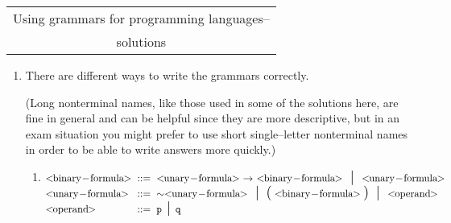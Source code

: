 \documentclass[11pt]{article}
\begin{document}
  \header{\course}
         {
           \begin{tabular}[t]{@{}c@{}}
             Using grammars for programming languages--
             \\
             solutions
           \end{tabular}
         }
         {\Term}

    \vspace{-2mm}

  \begin{enumerate}

    \addtolength{\itemsep}{8mm}

    \item There are different ways to write the grammars correctly.

          (Long nonterminal names, like those used in some of the solutions
           here, are fine in general and can be helpful since they are more
           descriptive, but in an exam situation you might prefer to use
           short single--letter nonterminal names in order to be able to
           write answers more quickly.)

          \vspace{-3mm}

          \begin{enumerate}

            \addtolength{\itemsep}{4mm}

            \item \newcommand{\binaryformula}{\ensuremath{<\!\!
                                            \mathrm{binary\!-\!formula} \!\!>}}
                  \newcommand{\unaryformula}{\ensuremath{<\!\!
                                             \mathrm{unary\!-\!formula} \!\!>}}
                  \newcommand{\operand}{\ensuremath{<\!\!
                                          \mathrm{operand} \!\!>}}

                  \(
                    \renewcommand{\arraystretch}{1.25}
                    \begin{array}[t]{@{}l@{\hspace{2mm}}l@{\hspace{2mm}}l}
                      \binaryformula
                        & ::=
                        & \unaryformula \ \rightarrow \
                          \binaryformula \midspc \unaryformula
                          \\
                      \unaryformula
                        & ::=
                        & \sim \unaryformula \midspc \:
                          \lpar \binaryformula \rpar \: \midspc \operand
                        \\
                      \operand
                        & ::=
                        & \mathtt{p} \midspc \mathtt{q}
                        \\
                    \end{array}
                  \)


\end{enumerate}
\end{enumerate}
\end{document}
